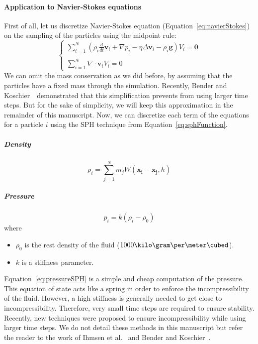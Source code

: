 \paragraph{Application to Navier-Stokes equations}
First of all, let us discretize Navier-Stokes equation (Equation~\eqref{eq:navierStokes}) on the sampling of the particles using the midpoint rule:
\begin{equation}
\label{eq:particleNavierStokes}
\left\lbrace
\begin{array}{ll}
\displaystyle \sum_{i=1}^{N} \left( \rho_{i} \frac{d}{dt} \mathbf{v}_{i} + \nabla p_{i} - \eta \Delta \mathbf{v}_{i} - \rho_{i} \mathbf{g} \right) V_{i} = \mathbf{0}\\ \\
\displaystyle \sum_{i=1}^{N} \nabla \cdot \mathbf{v}_{i} V_{i} = 0
\end{array}
\right.
\end{equation}
We can omit the mass conservation as we did before, by assuming that the particles have a fixed mass through the simulation. Recently, Bender and Koschier~\cite{Bender2015}~demonstrated that this simplification prevents from using larger time steps. But for the sake of simplicity, we will keep this approximation in the remainder of this manuscript. Now, we can discretize each term of the equations for a particle $i$ using the SPH technique from Equation~\eqref{eq:sphFunction}.
\subparagraph{Density}
\begin{equation}
\label{eq:densitySPH}
\rho_{i} = \sum_{j=1}^{N} m_{j}W(\mathbf{x_{i}}-\mathbf{x_{j}},h)
\end{equation}
\subparagraph{Pressure}
\begin{equation}
\label{eq:pressureSPH}
p_{i} = k\left(\rho_{i}-\rho_{0}\right)
\end{equation}
where 
\begin{itemize}
\item $\rho_{0}$ is the rest density of the fluid ($1000\kilo\gram\per\meter\cubed$).
\item $k$ is a stiffness parameter.
\end{itemize}
Equation~\eqref{eq:pressureSPH} is a simple and cheap computation of the pressure. This equation of state acts like a spring in order to enforce the incompressibility of the fluid.
However, a high stiffness is generally needed to get close to incompressibility. Therefore, very small time steps are required to ensure stability. Recently, new techniques were proposed to ensure incompressibility while using larger time steps. We do not detail these methods in this manuscript but refer the reader to the work of Ihmsen et al.~\cite{Ihmsen2014:IISPH} and Bender and Koschier~\cite{Bender2015}.
